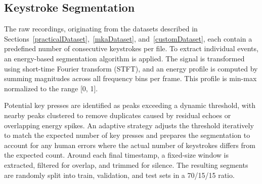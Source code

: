 \documentclass[a4paper,11pt,twoside]{report}
\theoremstyle{definition}
\begin{document}
\subsection{Keystroke Segmentation}

The raw recordings, originating from the datasets described in Sections~\ref{practicalDataset},~\ref{mkaDataset}, and~\ref{customDataset}, each contain a predefined number of consecutive keystrokes per file. To extract individual events, an energy-based segmentation algorithm is applied. The signal is transformed using short-time Fourier transform (STFT), and an energy profile is computed by summing magnitudes across all frequency bins per frame. This profile is min-max normalized to the range [0, 1].

Potential key presses are identified as peaks exceeding a dynamic threshold, with nearby peaks clustered to remove duplicates caused by residual echoes or overlapping energy spikes. An adaptive strategy adjusts the threshold iteratively to match the expected number of key presses and prepares the segmentation to account for any human errors where the actual number of keystrokes differs from the expected count. Around each final timestamp, a fixed-size window is extracted, filtered for overlap, and trimmed for silence. The resulting segments are randomly split into train, validation, and test sets in a 70/15/15 ratio.
\end{document}

